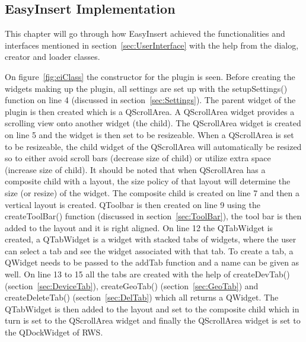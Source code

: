 \subsection{EasyInsert Implementation}
This chapter will go through how EasyInsert achieved the functionalities and interfaces mentioned in section~\ref{sec:UserInterface} with the help from the dialog, creator and loader classes. 

On figure~\ref{fig:eiClass} the constructor for the plugin is seen. Before creating the widgets making up the plugin, all settings are set up with the setupSettings() function on line 4 (discussed in section~\ref{sec:Settings}). The parent widget of the plugin is then created which is a QScrollArea. A QScrollArea widget provides a scrolling view onto another widget (the child). The QScrollArea widget is created on line 5 and the widget is then set to be resizeable. When a QScrollArea is set to be resizeable, the child widget of the QScrollArea will automatically be resized so to either avoid scroll bars (decrease size of child) or utilize extra space (increase size of child). It should be noted that when QScrollArea has a composite child with a layout, the size policy of that layout will determine the size (or resize) of the widget. The composite child is created on line 7 and then a vertical layout is created. QToolbar is then created on line 9 using the createToolBar() function (discussed in section~\ref{sec:ToolBar}), the tool bar is then added to the layout and it is right aligned. On line 12 the QTabWidget is created, a QTabWidget is a widget with stacked tabs of widgets, where the user can select a tab and see the widget associated with that tab. To create a tab, a QWidget needs to be passed to the addTab function and a name can be given as well. On line 13 to 15 all the tabs are created with the help of createDevTab() (section~\ref{sec:DeviceTab}), createGeoTab() (section~\ref{sec:GeoTab}) and createDeleteTab() (section~\ref{sec:DelTab}) which all returns a QWidget. The QTabWidget is then added to the layout and set to the composite child which in turn is set to the QScrollArea widget and finally the QScrollArea widget is set to the QDockWidget of RWS. 


